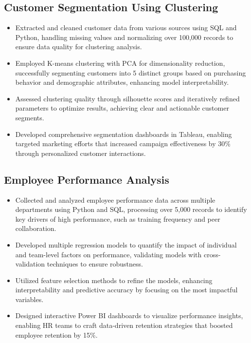 \documentclass[12pt,a4paper]{article}
\begin{document}
\subsection*{Customer Segmentation Using Clustering}
\begin{itemize}[leftmargin=*,noitemsep,topsep=0pt]
\item Extracted and cleaned customer data from various sources using SQL and Python, handling missing values and normalizing over 100,000 records to ensure data quality for clustering analysis.
\item Employed K-means clustering with PCA for dimensionality reduction, successfully segmenting customers into 5 distinct groups based on purchasing behavior and demographic attributes, enhancing model interpretability.
\item Assessed clustering quality through silhouette scores and iteratively refined parameters to optimize results, achieving clear and actionable customer segments.
\item Developed comprehensive segmentation dashboards in Tableau, enabling targeted marketing efforts that increased campaign effectiveness by 30\% through personalized customer interactions.
\end{itemize}

\subsection*{Employee Performance Analysis}
\begin{itemize}[leftmargin=*,noitemsep,topsep=0pt]
\item Collected and analyzed employee performance data across multiple departments using Python and SQL, processing over 5,000 records to identify key drivers of high performance, such as training frequency and peer collaboration.
\item Developed multiple regression models to quantify the impact of individual and team-level factors on performance, validating models with cross-validation techniques to ensure robustness.
\item Utilized feature selection methods to refine the models, enhancing interpretability and predictive accuracy by focusing on the most impactful variables.
\item Designed interactive Power BI dashboards to visualize performance insights, enabling HR teams to craft data-driven retention strategies that boosted employee retention by 15\%.
\end{itemize}
\end{document}
